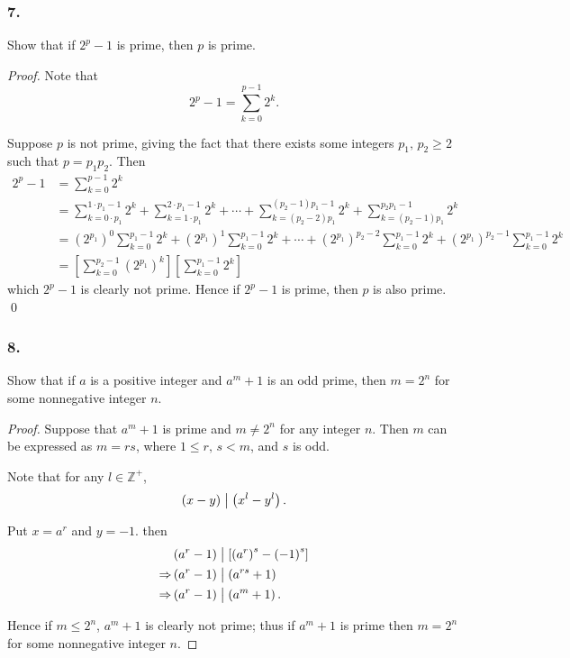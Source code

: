 \subsubsection{7.} Show that if $2^p-1$ is prime, then $p$ is prime.

\begin{proof}
    Note that
    \[
        2^p-1 = \sum_{k=0}^{p-1} 2^k.    
    \]
    
    Suppose $p$ is not prime, giving the fact that there exists some integers
    $p_1,\,p_2 \geq 2$ such that $p=p_1p_2$. Then
    \begin{align*}
        2^p-1 &= \sum_{k=0}^{p-1} 2^k \\
        &= \sum_{k=0\cdot p_1}^{1\cdot p_1-1} 2^k
        + \sum_{k=1\cdot p_1}^{2\cdot p_1-1} 2^k
        + \cdots
        + \sum_{k=\left(p_2-2\right) p_1}^{\left(p_2-1\right) p_1-1} 2^k
        + \sum_{k=\left(p_2-1\right) p_1}^{p_2p_1-1} 2^k \\
        &= \left(2^{p_1}\right)^0 \sum_{k=0}^{p_1-1} 2^k
        + \left(2^{p_1}\right)^1 \sum_{k=0}^{p_1-1} 2^k
        + \cdots
        + \left(2^{p_1}\right)^{p_2-2} \sum_{k=0}^{p_1-1} 2^k
        + \left(2^{p_1}\right)^{p_2-1} \sum_{k=0}^{p_1-1} 2^k \\
        &= \left[\sum_{k=0}^{p_2-1} \left(2^{p_1}\right)^k\right]
        \left[\sum_{k=0}^{p_1-1} 2^k\right]
    \end{align*}
    which $2^p-1$ is clearly not prime. Hence if $2^p-1$ is prime, then $p$ is also prime.
    \qed
\end{proof}

\subsubsection{8.} Show that if $a$ is a positive integer and $a^m+1$ is an odd
prime, then $m=2^n$ for some nonnegative integer $n$.

\begin{proof}
    Suppose that $a^m+1$ is prime and $m\neq 2^n$ for any integer $n$. Then
    $m$ can be expressed as $m=rs$, where $1\leq r,\,s < m$, and $s$ is odd.

    Note that for any $l \in \mathbb{Z}^+$, 
    \[
        \left(x-y\right) \bigm| \left(x^l-y^l\right).
    \]

    Put $x=a^r$ and $y=-1$. then
    \begin{align*}
        & \left(a^r-1\right) \bigm| \left[\left(a^r\right)^s - \left(-1\right)^s\right] \\
        \Rightarrow & \left(a^r-1\right) \bigm| \left(a^{rs} + 1\right) \\
        \Rightarrow & \left(a^r-1\right) \bigm| \left(a^m+1\right).
    \end{align*}

    Hence if $m \leq 2^n$, $a^m+1$ is clearly not prime; thus
    if $a^m+1$ is prime then $m=2^n$ for some nonnegative integer $n$.
\end{proof}

